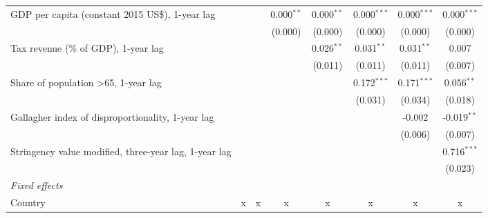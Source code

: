 \begin{tabular}{lccccccc}
   GDP per capita (constant 2015 US\$), 1-year lag                         &                &                & 0.000$^{**}$   & 0.000$^{**}$   & 0.000$^{***}$  & 0.000$^{***}$  & 0.000$^{***}$\\   
                                                                           &                &                & (0.000)        & (0.000)        & (0.000)        & (0.000)        & (0.000)\\   
   Tax revenue (\% of GDP), 1-year lag                                     &                &                &                & 0.026$^{**}$   & 0.031$^{**}$   & 0.031$^{**}$   & 0.007\\   
                                                                           &                &                &                & (0.011)        & (0.011)        & (0.011)        & (0.007)\\   
   Share of population >65, 1-year lag                                     &                &                &                &                & 0.172$^{***}$  & 0.171$^{***}$  & 0.056$^{**}$\\   
                                                                           &                &                &                &                & (0.031)        & (0.034)        & (0.018)\\   
   Gallagher index of disproportionality, 1-year lag                       &                &                &                &                &                & -0.002         & -0.019$^{**}$\\   
                                                                           &                &                &                &                &                & (0.006)        & (0.007)\\   
   Stringency value modified, three-year lag, 1-year lag                   &                &                &                &                &                &                & 0.716$^{***}$\\   
                                                                           &                &                &                &                &                &                & (0.023)\\   
   \emph{Fixed effects}\\
   Country                                                                 & x              & x              & x              & x              & x              & x              & x\\  

\end{tabular}
